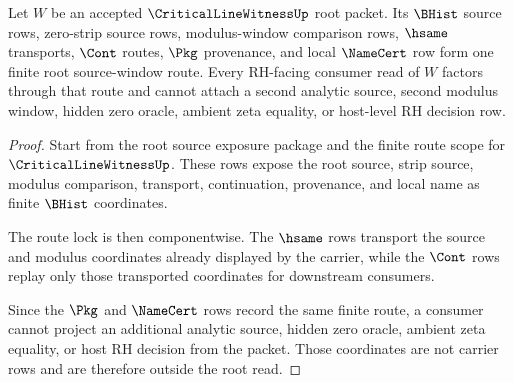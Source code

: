 \begin{theorem}
\label{thm:critical-line-witness-root-source-window-route-lock}
Let $W$ be an accepted $\CriticalLineWitnessUp$ root packet. Its $\BHist$ source rows, zero-strip source rows, modulus-window comparison rows, $\hsame$ transports, $\Cont$ routes, $\Pkg$ provenance, and local $\NameCert$ row form one finite root source-window route. Every RH-facing consumer read of $W$ factors through that route and cannot attach a second analytic source, second modulus window, hidden zero oracle, ambient zeta equality, or host-level RH decision row.
\end{theorem}
\begin{proof}
Start from the root source exposure package and the finite route scope for $\CriticalLineWitnessUp$. These rows expose the root source, strip source, modulus comparison, transport, continuation, provenance, and local name as finite $\BHist$ coordinates.

The route lock is then componentwise. The $\hsame$ rows transport the source and modulus coordinates already displayed by the carrier, while the $\Cont$ rows replay only those transported coordinates for downstream consumers.

Since the $\Pkg$ and $\NameCert$ rows record the same finite route, a consumer cannot project an additional analytic source, hidden zero oracle, ambient zeta equality, or host RH decision from the packet. Those coordinates are not carrier rows and are therefore outside the root read.
\end{proof}

